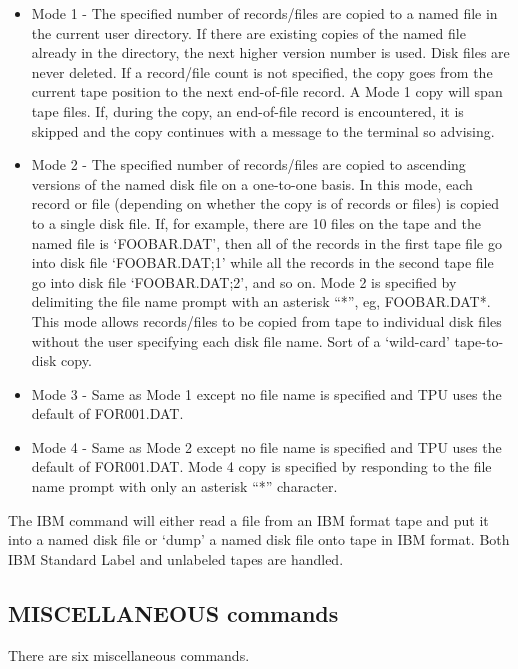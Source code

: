 \begin{itemize}
\item
Mode 1 - The specified number of records/files are copied to a named file in the
current user directory.
If there are existing copies of the named file already in the directory, the
next higher version number is used.
Disk files are never deleted.
If a record/file count is not specified, the copy goes from the current tape
position to the next end-of-file record.
A Mode 1 copy will span tape files.
If, during the copy, an end-of-file record is encountered, it is skipped and the
copy continues with a message to the terminal so advising.

\item
Mode 2 - The specified number of records/files are copied to ascending versions
of the named disk file on a one-to-one basis.
In this mode, each record or file (depending on whether the copy is of records
or files) is copied to a single disk file.
If, for example, there are 10 files on the tape and the named file is
`FOOBAR.DAT', then all of the records in the first tape file go into disk file
`FOOBAR.DAT;1' while all the records in the second tape file go into disk file
`FOOBAR.DAT;2', and so on.
Mode 2 is specified by delimiting the file name prompt with an asterisk ``*'',
eg, FOOBAR.DAT*.
This mode allows records/files to be copied from tape to individual disk files
without the user specifying each disk file name.
Sort of a `wild-card' tape-to-disk copy.

\item
Mode 3 - Same as Mode 1 except no file name is specified and TPU uses the
default of FOR001.DAT.

\item
Mode 4 - Same as Mode 2 except no file name is specified and TPU uses the
default of FOR001.DAT.
Mode 4 copy is specified by responding to the file name prompt with only an
asterisk ``*'' character.
\end{itemize}

The IBM command will either read a file from an IBM format tape and put it into
a named disk file or `dump' a named disk file onto tape in IBM format.
Both IBM Standard Label and unlabeled tapes are handled.

\subsection{MISCELLANEOUS commands}

There are six miscellaneous commands.


